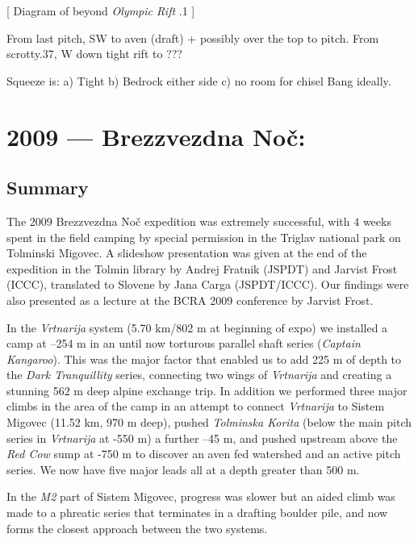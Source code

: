{[} Diagram of beyond \emph{Olympic Rift} .1 {]}

From last pitch, SW to aven (draft) + possibly over the top to pitch.
From scrotty.37, W down tight rift to ???

Squeeze is: a) Tight b) Bedrock either side c) no room for chisel Bang
ideally.


\hypertarget{brezzvezdna-noux10d}{%
\chapter{2009 --- Brezzvezdna Noč:}\label{brezzvezdna-noux10d}}

\hypertarget{summary}{%
\section{Summary}\label{summary}}

The 2009 Brezzvezdna Noč expedition was extremely successful, with 4
weeks spent in the field camping by special permission in the Triglav
national park on Tolminski Migovec. A slideshow presentation was given
at the end of the expedition in the Tolmin library by Andrej Fratnik
(JSPDT) and Jarvist Frost (ICCC), translated to Slovene by Jana Carga
(JSPDT/ICCC). Our findings were also presented as a lecture at the BCRA
2009 conference by Jarvist Frost.

In the \emph{Vrtnarija} system (5.70 km/802 m at beginning of expo) we
installed a camp at --254 m in an until now torturous parallel shaft
series (\emph{Captain Kangaroo}). This was the major factor that enabled
us to add 225 m of depth to the \emph{Dark Tranquillity} series,
connecting two wings of \emph{Vrtnarija} and creating a stunning 562 m
deep alpine exchange trip. In addition we performed three major climbs
in the area of the camp in an attempt to connect \emph{Vrtnarija} to
Sistem Migovec (11.52 km, 970 m deep), pushed \emph{Tolminska Korita}
(below the main pitch series in \emph{Vrtnarija} at -550 m) a further
--45 m, and pushed upstream above the \emph{Red Cow} sump at -750 m to
discover an aven fed watershed and an active pitch series. We now have
five major leads all at a depth greater than 500 m.

In the \emph{M2} part of Sistem Migovec, progress was slower but an
aided climb was made to a phreatic series that terminates in a drafting
boulder pile, and now forms the closest approach between the two
systems.

